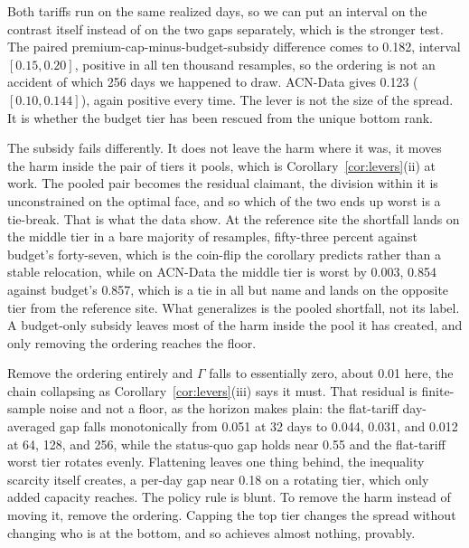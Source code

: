 \documentclass[manuscript, screen, review, anonymous]{acmart}
\begin{document}
Both tariffs run on the same realized days, so we can put an interval on the contrast itself instead of on the two gaps separately, which is the stronger test. The paired premium-cap-minus-budget-subsidy difference comes to 0.182, interval $[0.15, 0.20]$, positive in all ten thousand resamples, so the ordering is not an accident of which 256 days we happened to draw. ACN-Data gives 0.123 ($[0.10, 0.144]$), again positive every time. The lever is not the size of the spread. It is whether the budget tier has been rescued from the unique bottom rank.

The subsidy fails differently. It does not leave the harm where it was, it moves the harm inside the pair of tiers it pools, which is Corollary~\ref{cor:levers}(ii) at work. The pooled pair becomes the residual claimant, the division within it is unconstrained on the optimal face, and so which of the two ends up worst is a tie-break. That is what the data show. At the reference site the shortfall lands on the middle tier in a bare majority of resamples, fifty-three percent against budget's forty-seven, which is the coin-flip the corollary predicts rather than a stable relocation, while on ACN-Data the middle tier is worst by 0.003, 0.854 against budget's 0.857, which is a tie in all but name and lands on the opposite tier from the reference site. What generalizes is the pooled shortfall, not its label. A budget-only subsidy leaves most of the harm inside the pool it has created, and only removing the ordering reaches the floor.

Remove the ordering entirely and $\Gamma$ falls to essentially zero, about 0.01 here, the chain collapsing as Corollary~\ref{cor:levers}(iii) says it must. That residual is finite-sample noise and not a floor, as the horizon makes plain: the flat-tariff day-averaged gap falls monotonically from 0.051 at 32 days to 0.044, 0.031, and 0.012 at 64, 128, and 256, while the status-quo gap holds near 0.55 and the flat-tariff worst tier rotates evenly. Flattening leaves one thing behind, the inequality scarcity itself creates, a per-day gap near 0.18 on a rotating tier, which only added capacity reaches. The policy rule is blunt. To remove the harm instead of moving it, remove the ordering. Capping the top tier changes the spread without changing who is at the bottom, and so achieves almost nothing, provably.
\end{document}
